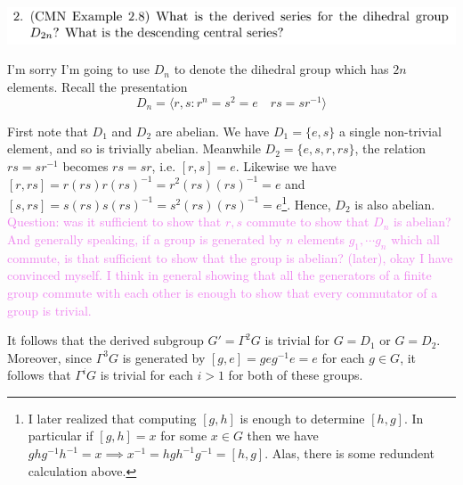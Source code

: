 \documentclass[12pt,letterpaper,boxed]{hmcpset}
\newcommand{\wg}[1]{\textcolor{violet}{#1}}
\newcommand{\inv}{^{-1}}
\begin{document}
\newpage


\begin{problem}
	\includegraphics[scale=0.8]{2.png}
	\hfill
\end{problem}

\begin{solution}
I'm sorry I'm going to use $D_n$ to denote the dihedral group which
has $2n$ elements. Recall the presentation \[
	D_n = \langle 
		r,s : r^n = s^2 = e \quad rs = sr\inv 
	\rangle
\]

First note that $D_1$ and $D_2$ are abelian. 
We have $D_1 = \{ e, s \}$ a single non-trivial element, and so is
trivially abelian. Meanwhile $D_2 = \{ e, s, r, rs \}$, the relation 
$rs = sr\inv$ becomes $rs = sr$, i.e. $[r,s] = e$. Likewise we have 
$[r,rs] = r(rs)r(rs)\inv = r^2 (rs)(rs)\inv = e$ and 
$[s, rs] = s (rs) s (rs)\inv = s^2 (rs) (rs)\inv = e$\footnote{
I later realized that computing $[g,h]$ is enough to determine
$[h,g]$. In particular if $[g,h] = x$ for some $x \in G$ then we have
$ghg\inv h\inv = x \implies x\inv = h g h\inv g\inv = [h,g]$. Alas,
there is some redundent calculation above.
}. Hence, $D_2$ is
also abelian. \wg{Question: was it sufficient to show that $r,s$
commute to show that $D_n$ is abelian? And generally speaking, if a
group is generated by $n$ elements $g_1, \cdots g_n$ which all
commute, is that sufficient to show that the group is abelian?}
\wg{(later), okay I have convinced myself. I think in general 
showing that all the generators of a finite group commute with each other is
enough to show that every commutator of a group is trivial.}

It follows that the
derived subgroup $G' = \Gamma^2 G$ is trivial for $G = D_1$ or $G =
D_2$.
Moreover, since $\Gamma^3 G$ is generated by $[g, e] = g e
g\inv e = e$ for each $g \in G$, it follows that $\Gamma^i G$ is
trivial for each $i > 1$ for both of these groups.


\end{solution}
\end{document}
